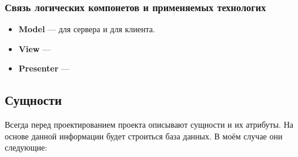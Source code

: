 \subsubsection{Связь логических компонетов и применяемых технологих}
\begin{itemize}
    \item \textbf{Model} --- \textcite{seqorm} для сервера и \textcite{redux} для клиента.
    \item \textbf{View} --- \textcite{react}
    \item \textbf{Presenter} --- \textcite{express}
\end{itemize}

\subsection{Сущности}
Всегда перед проектированием проекта описывают сущности и их атрибуты. На основе данной информации будет строиться база данных. В моём случае они следующие:

